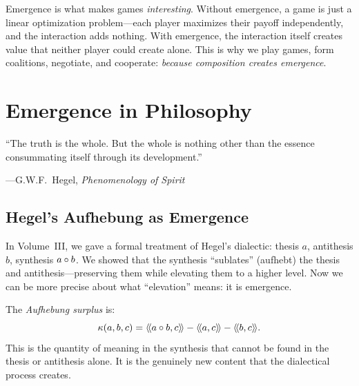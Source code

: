 Emergence is what makes games \emph{interesting}. Without emergence, a game
is just a linear optimization problem---each player maximizes their payoff
independently, and the interaction adds nothing. With emergence, the interaction
itself creates value that neither player could create alone. This is why we play
games, form coalitions, negotiate, and cooperate: \emph{because composition
creates emergence}.



\chapter{Emergence in Philosophy}
\label{ch:emergence-philosophy}

\epigraph{``The truth is the whole. But the whole is nothing other than
the essence consummating itself through its development.''}
{---G.W.F.\ Hegel, \emph{Phenomenology of Spirit}}


\section{Hegel's Aufhebung as Emergence}

In Volume~III, we gave a formal treatment of Hegel's dialectic: thesis $a$,
antithesis $b$, synthesis $a \circ b$. We showed that the synthesis
``sublates'' (aufhebt) the thesis and antithesis---preserving them while
elevating them to a higher level. Now we can be more precise about what
``elevation'' means: it is emergence.

The \emph{Aufhebung surplus} is:
\[
  \kappa(a, b, c) = \langle\!\langle a \circ b, c \rangle\!\rangle - \langle\!\langle a, c \rangle\!\rangle - \langle\!\langle b, c \rangle\!\rangle.
\]
This is the quantity of meaning in the synthesis that cannot be found in
the thesis or antithesis alone. It is the genuinely new content that the
dialectical process creates.

